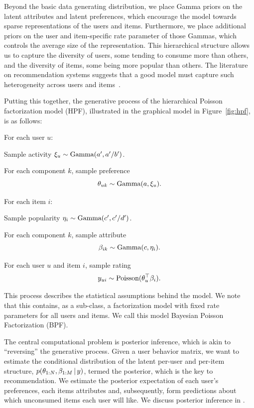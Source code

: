 Beyond the basic data generating distribution, we place Gamma priors
on the latent attributes and latent preferences, which encourage the
model towards sparse representations of the users and items.
Furthermore, we place additional priors on the user and item-specific
rate parameter of those Gammas, which controls the average size of the
representation.  This hierarchical structure allows us to capture the
diversity of users, some tending to consume more than others, and the
diversity of items, some being more popular than others.  The
literature on recommendation systems suggests that a good model must
capture such heterogeneity across users and items~\cite{Koren:2009}.

Putting this together, the generative process of the hierarchical
Poisson factorization model (HPF), illustrated in
the graphical model in Figure~\ref{fig:hpf}, is as follows:
\begin{enumerate*}
\item For each user $u$:
  \begin{enumerate*}
  \item Sample activity $\xi_u \sim \textrm{Gamma}(a', a'/b')$.
  \item For each component $k$, sample preference $$\theta_{uk} \sim
    \textrm{Gamma}(a, \xi_u).$$
  \end{enumerate*}

\item For each item $i$:
  \begin{enumerate*}
    \item Sample popularity $\eta_i \sim \textrm{Gamma}(c', c'/d')$.
    \item For each component $k$, sample attribute
      $$\beta_{ik} \sim \textrm{Gamma}(c, \eta_i).$$
  \end{enumerate*}

\item For each user $u$ and item $i$, sample rating
  $$y_{ui} \sim
  \textrm{Poisson}(\theta_u^\top \beta_i).$$
\end{enumerate*}
This process describes the statistical assumptions behind the model.
We note that this contains, as a sub-class, a factorization model
with fixed rate parameters for all users and items. We call this model
Bayesian Poisson Factorization (BPF).

The central computational problem is posterior inference, which is
akin to ``reversing'' the generative process.  Given a user behavior
matrix, we want to estimate the conditional distribution of the latent
per-user and per-item structure, $p(\theta_{1:N}, \beta_{1:M} \,\vert\, y)$,
termed the posterior, which is the key to recommendation.  We estimate the posterior
expectation of each user's preferences, each items attributes and,
subsequently, form predictions about which unconsumed items each user
will like.  We discuss posterior inference in
.


